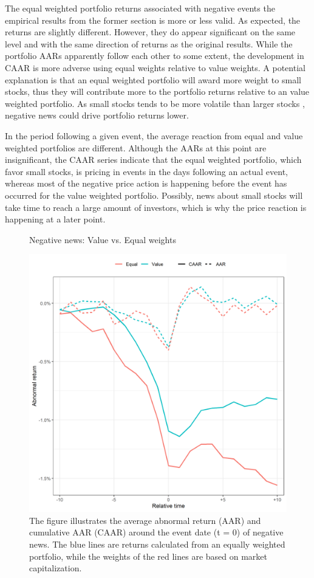 The equal weighted portfolio returns associated with negative events the empirical results from the former section is more or less valid. As expected, the returns are slightly different. However, they do appear significant on the same level and with the same direction of returns as the original results. While the portfolio AARs apparently follow each other to some extent, the development in CAAR is more adverse using equal weights relative to value weights. A potential explanation is that an equal weighted portfolio will award more weight to small stocks, thus they will contribute more to the portfolio returns relative to an value weighted portfolio. As small stocks tends to be more volatile than larger stocks \cite{Fama_french_3fac}, negative news could drive portfolio returns lower. 

In the period following a given event, the average reaction from equal and value weighted portfolios are different. Although the AARs at this point are insignificant, the CAAR series indicate that the equal weighted portfolio, which favor small stocks, is pricing in events in the days following an actual event, whereas most of the negative price action is happening before the event has occurred for the value weighted portfolio. Possibly, news about small stocks will take time to reach a large amount of investors, which is why the price reaction is happening at a later point. 

\begin{figure} [H]
    \centering
    \caption{Negative news: Value vs. Equal weights}
    \includegraphics[scale=0.6]{Projekt/1.Figures analysis/ST_negative_sensitivity_weight.png}
     \caption*{\footnotesize The figure illustrates the average abnormal return (AAR) and cumulative AAR (CAAR) around the event date (t = 0) of negative news. The blue lines are returns calculated from an equally weighted portfolio, while the weights of the red lines are based on market capitalization.}
    \label{fig:ST_neg_sensitivity_weight}
\end{figure} 


